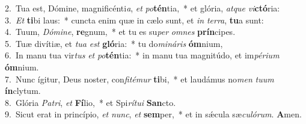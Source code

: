 {2.~}Tua est, Dómine, magnificénti\textit{a}, \textit{et} \textit{po}\textbf{tén}tia,~* et glória, \textit{at}\textit{que} \textit{vi}\textbf{ctó}ria:\\
{3.~}\textit{Et} \textbf{ti}bi laus:~* cuncta enim quæ in cælo sunt, et \textit{in} \textit{ter}\textit{ra}, \textbf{tu}a sunt:\\
{4.~}Tuum, \textit{Dó}\textit{mi}\textit{ne}, \textbf{re}gnum,~* et tu es su\textit{per} \textit{om}\textit{nes} \textbf{prín}cipes.\\
{5.~}Tuæ divítiæ, et \textit{tu}\textit{a} \textit{est} \textbf{gló}ria:~* tu do\textit{mi}\textit{ná}\textit{ris} \textbf{óm}nium,\\
{6.~}In manu tua vir\textit{tus} \textit{et} \textit{po}\textbf{tén}tia:~* in manu tua magnitúdo, et im\textit{pé}\textit{ri}\textit{um} \textbf{óm}nium.\\
{7.~}Nunc ígitur, Deus noster, con\textit{fi}\textit{té}\textit{mur} \textbf{ti}bi,~* et laudámus no\textit{men} \textit{tu}\textit{um} \textbf{ín}clytum.\\
{8.~}Glória \textit{Pa}\textit{tri}, \textit{et} \textbf{Fí}lio,~* et Spi\textit{rí}\textit{tu}\textit{i} \textbf{San}cto.\\
{9.~}Sicut erat in princípio, \textit{et} \textit{nunc}, \textit{et} \textbf{sem}per,~* et in sǽcula sæ\textit{cu}\textit{ló}\textit{rum}. \textbf{A}men.\\
